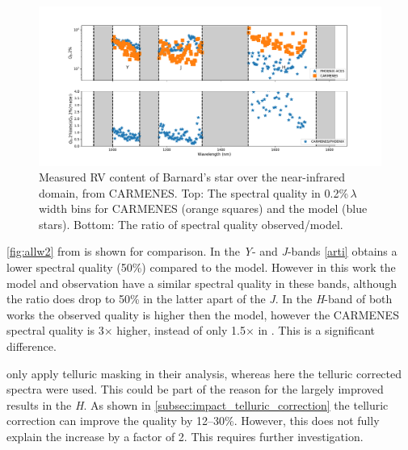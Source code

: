 \begin{figure}
    \centering
    \includegraphics[width=0.7\linewidth]{figures/information-content/Carmenes/quality_comparision_to_model}
    \caption[Barnard's star spectral quality compared to CARMENES]{Measured RV content of Barnard's star over the near-infrared domain, from CARMENES.
    Top: The spectral quality in 0.2\%\,\(\lambda\) width bins for CARMENES (orange squares) and the model (blue stars).
    Bottom: The ratio of spectral quality observed/model.}
    \label{fig:qualitycomparisiontomodel}
\end{figure}

\cref{fig:allw2} from \citep{artigau_optical_2018} is shown for comparison.
In the \emph{Y}- and \emph{J}-bands \cref{arti} obtains a lower spectral quality (50\%) compared to the model.
However in this work the model and observation have a similar spectral quality in these bands, although the ratio does drop to 50\% in the latter apart of the \emph{J}.
In the \emph{H}-band of both works the observed quality is higher then the model, however the CARMENES spectral quality is 3\(\times\) higher, instead of only 1.5\(\times\) in \citep{artigau_optical_2018}.
This is a significant difference.

\citep{artigau_optical_2018} only apply telluric masking in their analysis, whereas here the telluric corrected spectra were used.
This could be part of the reason for the largely improved results in the \emph{H}.
As shown in \cref{subsec:impact_telluric_correction} the telluric correction can improve the quality by 12--30\%.
However, this does not fully explain the increase by a factor of 2.
This requires further investigation.


